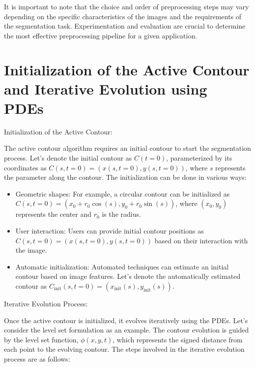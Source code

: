 \documentclass[]{report}
\begin{document}
It is important to note that the choice and order of preprocessing steps may vary depending on the specific characteristics of the images and the requirements of the segmentation task. Experimentation and evaluation are crucial to determine the most effective preprocessing pipeline for a given application.\\

\section*{Initialization of the Active Contour and Iterative Evolution using PDEs}

Initialization of the Active Contour:

The active contour algorithm requires an initial contour to start the segmentation process. Let's denote the initial contour as $C(t=0)$, parameterized by its coordinates as $C(s, t=0) = (x(s, t=0), y(s, t=0))$, where $s$ represents the parameter along the contour. The initialization can be done in various ways:

\begin{itemize}
\item Geometric shapes: For example, a circular contour can be initialized as $C(s, t=0) = (x_0 + r_0 \cos(s), y_0 + r_0 \sin(s))$, where $(x_0, y_0)$ represents the center and $r_0$ is the radius.

\item User interaction: Users can provide initial contour positions as $C(s, t=0) = (x(s, t=0), y(s, t=0))$ based on their interaction with the image.

\item Automatic initialization: Automated techniques can estimate an initial contour based on image features. Let's denote the automatically estimated contour as $C_{\text{init}}(s, t=0) = (x_{\text{init}}(s), y_{\text{init}}(s))$.
\end{itemize}

Iterative Evolution Process:

Once the active contour is initialized, it evolves iteratively using the PDEs. Let's consider the level set formulation as an example. The contour evolution is guided by the level set function, $\phi(x, y, t)$, which represents the signed distance from each point to the evolving contour. The steps involved in the iterative evolution process are as follows:
\end{document}
